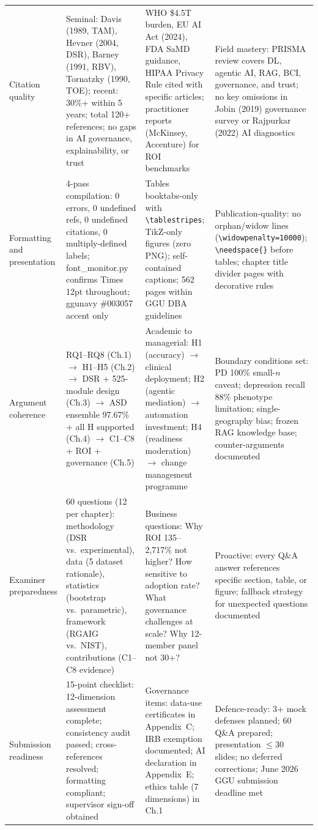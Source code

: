 \begin{xltabular}{\textwidth}{@{} >{\raggedright\arraybackslash}p{0.14\textwidth} X X X @{}}
\addlinespace
Citation quality         & Seminal: Davis (1989, TAM), Hevner (2004, DSR), Barney (1991, RBV), Tornatzky (1990, TOE); recent: 30\%+ within 5 years; total 120+ references; no gaps in AI governance, explainability, or trust & WHO \$4.5T burden, EU AI Act (2024), FDA SaMD guidance, HIPAA Privacy Rule cited with specific articles; practitioner reports (McKinsey, Accenture) for ROI benchmarks & Field mastery: PRISMA review covers DL, agentic AI, RAG, BCI, governance, and trust; no key omissions in Jobin (2019) governance survey or Rajpurkar (2022) AI diagnostics \\
\addlinespace
Formatting and presentation & 4-pass compilation: 0 errors, 0 undefined refs, 0 undefined citations, 0 multiply-defined labels; font\_monitor.py confirms Times 12pt throughout; ggunavy \#003057 accent only & Tables booktabs-only with \texttt{\textbackslash tablestripes}; TikZ-only figures (zero PNG); self-contained captions; 562 pages within GGU DBA guidelines & Publication-quality: no orphan/widow lines (\texttt{\textbackslash widowpenalty=10000}); \texttt{\textbackslash needspace\{\}} before tables; chapter title divider pages with decorative rules \\
\addlinespace
Argument coherence       & RQ1--RQ8 (Ch.1) $\rightarrow$ H1--H5 (Ch.2) $\rightarrow$ DSR + 525-module design (Ch.3) $\rightarrow$ ASD ensemble 97.67\% + all H supported (Ch.4) $\rightarrow$ C1--C8 + ROI + governance (Ch.5) & Academic to managerial: H1 (accuracy) $\rightarrow$ clinical deployment; H2 (agentic mediation) $\rightarrow$ automation investment; H4 (readiness moderation) $\rightarrow$ change management programme & Boundary conditions set: PD 100\% small-$n$ caveat; depression recall 88\% phenotype limitation; single-geography bias; frozen RAG knowledge base; counter-arguments documented \\
\addlinespace
Examiner preparedness    & 60 questions (12 per chapter): methodology (DSR vs.\ experimental), data (5 dataset rationale), statistics (bootstrap vs.\ parametric), framework (RGAIG vs.\ NIST), contributions (C1--C8 evidence) & Business questions: Why ROI 135--2{,}717\% not higher? How sensitive to adoption rate? What governance challenges at scale? Why 12-member panel not 30+? & Proactive: every Q\&A answer references specific section, table, or figure; fallback strategy for unexpected questions documented \\
\addlinespace
Submission readiness     & 15-point checklist: 12-dimension assessment complete; consistency audit passed; cross-references resolved; formatting compliant; supervisor sign-off obtained & Governance items: data-use certificates in Appendix~C; IRB exemption documented; AI declaration in Appendix~E; ethics table (7 dimensions) in Ch.1 & Defence-ready: 3+ mock defenses planned; 60 Q\&A prepared; presentation $\leq$30 slides; no deferred corrections; June 2026 GGU submission deadline met \\
\end{xltabular}
\endgroup

